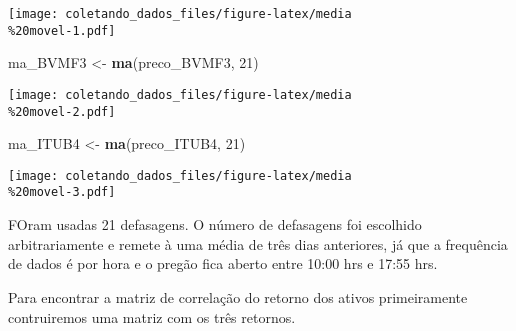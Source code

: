 \documentclass[]{article}
\newenvironment{Shaded}{\begin{snugshade}}{\end{snugshade}}
\newcommand{\KeywordTok}[1]{\textcolor[rgb]{0.13,0.29,0.53}{\textbf{{#1}}}}
\newcommand{\DataTypeTok}[1]{\textcolor[rgb]{0.13,0.29,0.53}{{#1}}}
\newcommand{\DecValTok}[1]{\textcolor[rgb]{0.00,0.00,0.81}{{#1}}}
\newcommand{\StringTok}[1]{\textcolor[rgb]{0.31,0.60,0.02}{{#1}}}
\newcommand{\CommentTok}[1]{\textcolor[rgb]{0.56,0.35,0.01}{\textit{{#1}}}}
\newcommand{\NormalTok}[1]{{#1}}
\begin{document}
\begin{Shaded}
\end{Shaded}

\texttt{[image: coletando\_dados\_files/figure-latex/media\\\%20movel-1.pdf]}

\begin{Shaded}
\begin{Highlighting}[]
\NormalTok{ma_BVMF3 <-}\StringTok{ }\KeywordTok{ma}\NormalTok{(preco_BVMF3, }\DecValTok{21}\NormalTok{)}
\end{Highlighting}
\end{Shaded}

\texttt{[image: coletando\_dados\_files/figure-latex/media\\\%20movel-2.pdf]}

\begin{Shaded}
\begin{Highlighting}[]
\NormalTok{ma_ITUB4 <-}\StringTok{ }\KeywordTok{ma}\NormalTok{(preco_ITUB4, }\DecValTok{21}\NormalTok{)}
\end{Highlighting}
\end{Shaded}

\texttt{[image: coletando\_dados\_files/figure-latex/media\\\%20movel-3.pdf]}

FOram usadas 21 defasagens. O número de defasagens foi escolhido
arbitrariamente e remete à uma média de três dias anteriores, já que a
frequência de dados é por hora e o pregão fica aberto entre 10:00 hrs e
17:55 hrs.

Para encontrar a matriz de correlação do retorno dos ativos
primeiramente contruiremos uma matriz com os três retornos.

\begin{Shaded}
\end{Shaded}
\end{document}
